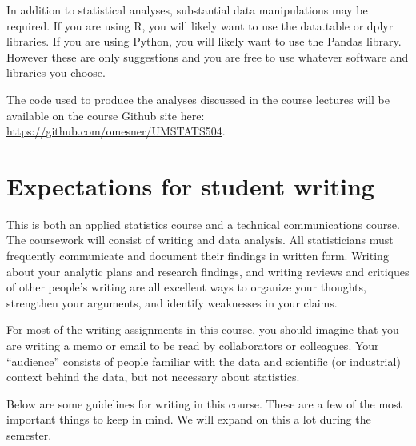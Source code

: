 \documentclass[11pt]{article}
\begin{document}
In addition to statistical analyses, substantial data manipulations may be required. If you are using R, you will likely want to use the data.table or dplyr libraries. If you are using Python, you will likely want to use the Pandas library. However these are only suggestions and you are free to use whatever software and libraries you choose.

The code used to produce the analyses discussed in the course lectures will be available on the course Github site here: \url{https://github.com/omesner/UMSTATS504}.

\section*{Expectations for student writing}

This is both an applied statistics course and a technical communications course. The coursework will consist of writing and data analysis. All statisticians must frequently communicate and document their findings in written form. Writing about your analytic plans and research findings, and writing reviews and critiques of other people’s writing are all excellent ways to organize your thoughts, strengthen your arguments, and identify weaknesses in your claims.

For most of the writing assignments in this course, you should imagine that you are writing a memo or email to be read by collaborators or colleagues. Your “audience” consists of people familiar with the data and scientific (or industrial) context behind the data, but not necessary about statistics.

Below are some guidelines for writing in this course. These are a few of the most important things to keep in mind. We will expand on this a lot during the semester.
\end{document}
